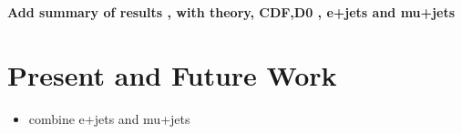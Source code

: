 \documentclass{cmspaperpdf}
\begin{document}
\textbf{Add summary of results , with theory, CDF,D0 , e+jets and mu+jets}


\section{Present and Future Work}
\begin{itemize}
\item combine e+jets and mu+jets
\end{itemize}


\end{document}
